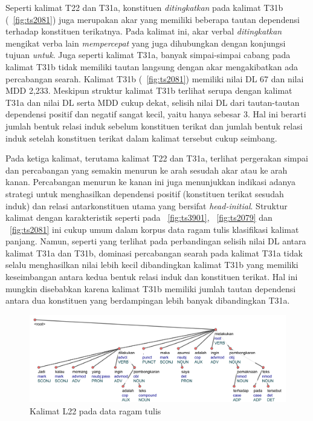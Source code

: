 Seperti kalimat T22 dan T31a, konstituen \textit{ditingkatkan} pada kalimat T31b (\pic~\ref{fig:ts2081}) juga merupakan akar yang memiliki beberapa tautan dependensi terhadap konstituen terikatnya. Pada kalimat ini, akar verbal \textit{ditingkatkan} mengikat verba lain \textit{mempercepat} yang juga dihubungkan dengan konjungsi tujuan \textit{untuk}. Juga seperti kalimat T31a, banyak simpai-simpai cabang pada kalimat T31b tidak memiliki tautan langsung dengan akar mengakibatkan ada percabangan searah. Kalimat T31b (\pic~\ref{fig:ts2081}) memiliki nilai DL 67 dan nilai MDD 2,233. Meskipun struktur kalimat T31b terlihat serupa dengan kalimat T31a dan nilai DL serta MDD cukup dekat, selisih nilai DL dari tautan-tautan dependensi positif dan negatif sangat kecil, yaitu hanya sebesar 3. Hal ini berarti jumlah bentuk relasi induk sebelum konstituen terikat dan jumlah bentuk relasi induk setelah konstituen terikat dalam kalimat tersebut cukup seimbang. 

Pada ketiga kalimat, terutama kalimat T22 dan T31a, terlihat pergerakan simpai dan percabangan yang semakin menurun ke arah sesudah akar atau ke arah kanan. Percabangan menurun ke kanan ini juga menunjukkan indikasi adanya strategi untuk menghasilkan dependensi positif (konstituen terikat sesudah induk) dan relasi antarkonstituen utama yang bersifat \textit{head-initial}. Struktur kalimat dengan karakteristik seperti pada \pic~\ref{fig:ts3901}, \pic~\ref{fig:ts2079} dan \pic~\ref{fig:ts2081} ini cukup umum dalam korpus data ragam tulis klasifikasi kalimat panjang. Namun, seperti yang terlihat pada perbandingan selisih nilai DL antara kalimat T31a dan T31b, dominasi percabangan searah pada kalimat T31a tidak selalu menghasilkan nilai lebih kecil dibandingkan kalimat T31b yang memiliki keseimbangan antara kedua bentuk relasi induk dan konstituen terikat. Hal ini mungkin disebabkan karena kalimat T31b memiliki jumlah tautan dependensi antara dua konstituen yang berdampingan lebih banyak dibandingkan T31a.

\begin{figure}
	\centering \includegraphics[width=1
	\textwidth] {pics/ls6521.jpg} 
	\caption{Kalimat L22 pada data ragam tulis} 
	\label{fig:ls6521} 
\end{figure}

